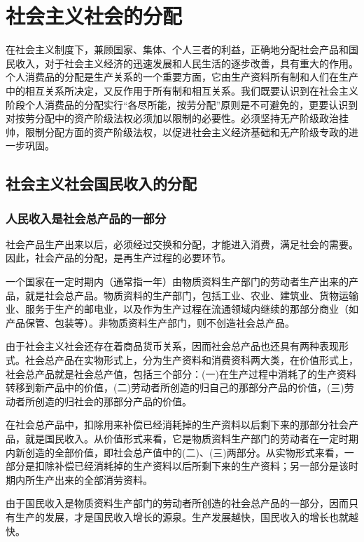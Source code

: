 \documentclass{book}
\begin{document}
\chapter{社会主义社会的分配}

在社会主义制度下，兼顾国家、集体、个人三者的利益，正确地分配社会产品和国民收入，对于社会主义经济的迅速发展和人民生活的逐步改善，具有重大的作用。个人消费品的分配是生产关系的一个重要方面，它由生产资料所有制和人们在生产中的相互关系所决定，又反作用于所有制和相互关系。我们既要认识到在社会主义阶段个人消费品的分配实行“各尽所能，按劳分配”原则是不可避免的，更要认识到对按劳分配中的资产阶级法权必须加以限制的必要性。必须坚持无产阶级政治挂帅，限制分配方面的资产阶级法权，以促进社会主义经济基础和无产阶级专政的进一步巩固。

\section{社会主义社会国民收入的分配}

\subsection{人民收入是社会总产品的一部分}

社会产品生产出来以后，必须经过交换和分配，才能进入消费，满足社会的需要。因此，社会产品的分配，是再生产过程的必要环节。

一个国家在一定时期内（通常指一年）由物质资料生产部门的劳动者生产出来的产品，就是社会总产品。物质资料的生产部门，包括工业、农业、建筑业、货物运输业、服务于生产的邮电业，以及作为生产过程在流通领域内继续的那部分商业（如产品保管、包装等）。非物质资料生产部门，则不创造社会总产品。

由于社会主义社会还存在着商品货币关系，因而社会总产品也还具有两种表现形式。社会总产品在实物形式上，分为生产资料和消费资科两大类，在价值形式上，社会总产品就是社会总产值，包括三个部分：(一)在生产过程中消耗了的生产资料转移到新产品中的价值，(二)劳动者所创造的归自己的那部分产品的价值，(三)劳动者所创造的归社会的那部分产品的价值。

在社会总产品中，扣除用来补偿已经消耗掉的生产资料以后剩下来的那部分社会产品，就是国民收入。从价值形式来看，它是物质资料生产部门的劳动者在一定时期内新创造的全部价值，即社会总产值中的(二)、(三)两部分。从实物形式来看，一部分是扣除补偿已经消耗掉的生产资料以后所剩下来的生产资料；另一部分是该时期内所生产出来的全部消劳资料。

由于国民收入是物质资料生产部门的劳动者所创造的社会总产品的一部分，因而只有生产的发展，才是国民收入增长的源泉。生产发展越快，国民收入的增长也就越快。
\end{document}
